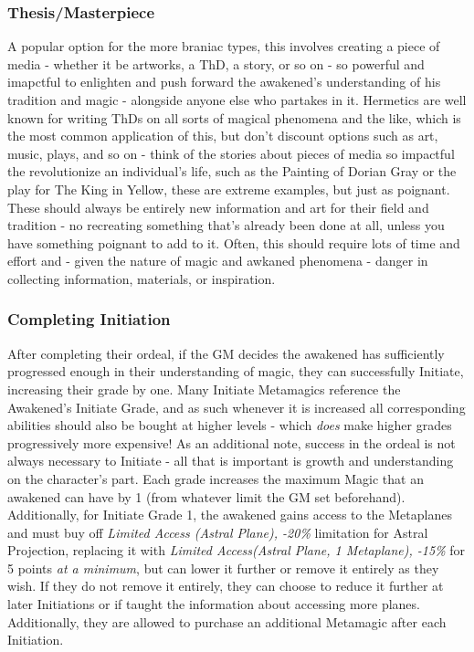\begin{multicols}{3}
	\subsubsection*{Thesis/Masterpiece}
	
	A popular option for the more braniac types, this involves creating a piece of media - whether it be artworks, a ThD, a story, or so on - so powerful and imapctful to enlighten and push forward the awakened's understanding of his tradition and magic - alongside anyone else who partakes in it. Hermetics are well known for writing ThDs on all sorts of magical phenomena and the like, which is the most common application of this, but don't discount options such as art, music, plays, and so on - think of the stories about pieces of media so impactful the revolutionize an individual's life, such as the Painting of Dorian Gray or the play for The King in Yellow, these are extreme examples, but just as poignant. These should always be entirely new information and art for their field and tradition - no recreating something that's already been done at all, unless you have something poignant to add to it. Often, this should require lots of time and effort and - given the nature of magic and awkaned phenomena - danger in collecting information, materials, or inspiration.
	
	\subsubsection*{Completing Initiation}
	
	After completing their ordeal, if the GM decides the awakened has sufficiently progressed enough in their understanding of magic, they can successfully Initiate, increasing their grade by one. Many Initiate Metamagics reference the Awakened's Initiate Grade, and as such whenever it is increased all corresponding abilities should also be bought at higher levels - which \textit{does} make higher grades progressively more expensive! As an additional note, success in the ordeal is not always necessary to Initiate - all that is important is growth and understanding on the character's part. Each grade increases the maximum Magic that an awakened can have by 1 (from whatever limit the GM set beforehand). Additionally, for Initiate Grade 1, the awakened gains access to the Metaplanes and must buy off \textit{Limited Access (Astral Plane), -20\%} limitation for Astral Projection, replacing it with \textit{Limited Access(Astral Plane, 1 Metaplane), -15\%} for 5 points \textit{at a minimum}, but can lower it further or remove it entirely as they wish. If they do not remove it entirely, they can choose to reduce it further at later Initiations or if taught the information about accessing more planes. Additionally, they are allowed to purchase an additional Metamagic after each Initiation.
	

\end{multicols}
